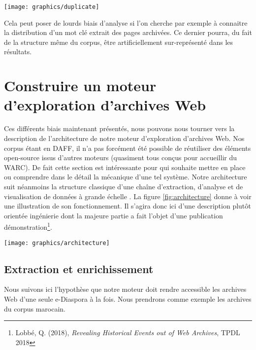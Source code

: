 \documentclass[symmetric,justified,marginals=raggedouter]{tufte-book}
\begin{document}
\begin{figure*}%
  \texttt{[image: graphics/duplicate]}
  \caption{Contenu d'une page (en rouge) collecté plusieurs fois}
  \label{fig:duplicate}
\end{figure*}

\noindent Cela peut poser de lourds biais d'analyse si l'on cherche par exemple à connaitre la distribution d'un mot clé extrait des pages archivées. Ce dernier pourra, du fait de la structure même du corpus, être artificiellement sur-représenté dans les résultats. 

\section{Construire un moteur d'exploration d'archives Web}
\label{sec:4_moteur}

\noindent Ces différents biais maintenant présentés, nous pouvons nous tourner vers la description de l'architecture de notre moteur d'exploration d'archives Web. Nos corpus étant en DAFF, il n'a pas forcément été possible de réutiliser des éléments open-source issus d'autres moteurs (quasiment tous conçus pour accueillir du WARC). De fait cette section est intéressante pour qui souhaite mettre en place ou comprendre dans le détail la mécanique d'une tel système. Notre architecture suit néanmoins la structure classique d'une chaîne d'extraction, d'analyse et de visualisation de données à grande échelle \citep{marz_big_2015}. La figure \ref{fig:architecture} donne à voir une illustration de son fonctionnement.  Il s'agira donc ici d'une description plutôt orientée ingénierie dont la majeure partie a fait l'objet d'une publication démonstration\footnote{Lobbé, Q. (2018), \textit{Revealing Historical Events out of Web Archives}, TPDL 2018}.

\begin{figure*}%
  \texttt{[image: graphics/architecture]}
  \caption{Architecture de notre moteur d'exploration d'archives Web}
  \label{fig:architecture}
\end{figure*}

\subsection{Extraction et enrichissement}

\noindent Nous suivons ici l'hypothèse que notre moteur doit rendre accessible les archives Web d'une seule e-Diaspora à la fois. Nous prendrons comme exemple les archives du corpus marocain.
 
\end{document}
